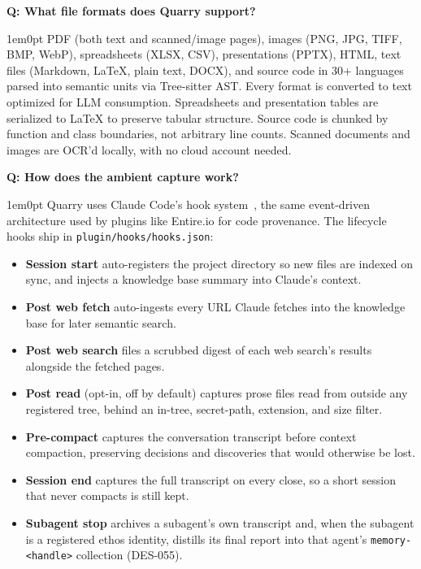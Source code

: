 \documentclass[11pt,letterpaper]{article}
\newcounter{faqnum}
\newenvironment{faqpair}[1]{%
  \needspace{4\baselineskip}%
  \vspace{0.5em}%
  \refstepcounter{faqnum}%
  \noindent\textbf{\color{SectionBlue}Q\thefaqnum: #1}\par\nopagebreak[4]%
  \vspace{0.2em}%
  \begin{adjustwidth}{1em}{0pt}%
  \setlength{\parindent}{0pt}%
}{%
  \end{adjustwidth}%
  \vspace{0.5em}%
}
\begin{document}
\begin{faqpair}{What file formats does Quarry support?}\label{faq:formats}
  PDF (both text and scanned/image pages), images (PNG, JPG, TIFF, BMP, WebP),
  spreadsheets (XLSX, CSV), presentations (PPTX), HTML, text files (Markdown,
  LaTeX, plain text, DOCX), and source code in 30+ languages parsed into
  semantic units via Tree-sitter AST. Every format is converted to text
  optimized for LLM consumption. Spreadsheets and presentation tables are
  serialized to LaTeX to preserve tabular structure. Source code is chunked by
  function and class boundaries, not arbitrary line counts. Scanned documents
  and images are OCR'd locally, with no cloud account needed.
\end{faqpair}

\begin{faqpair}{How does the ambient capture work?}\label{faq:how-it-works}
  Quarry uses Claude Code's hook system~\cite{claude-code-hooks}, the same
  event-driven architecture used by plugins like Entire.io for code provenance.
  The lifecycle hooks ship in \texttt{plugin/hooks/hooks.json}:

  \begin{itemize}[leftmargin=1.5em, nosep]
    \item \textbf{Session start} auto-registers the project directory so
          new files are indexed on sync, and injects a knowledge base summary
          into Claude's context.
    \item \textbf{Post web fetch} auto-ingests every URL Claude fetches
          into the knowledge base for later semantic search.
    \item \textbf{Post web search} files a scrubbed digest of each web
          search's results alongside the fetched pages.
    \item \textbf{Post read} (opt-in, off by default) captures prose files
          read from outside any registered tree, behind an in-tree,
          secret-path, extension, and size filter.
    \item \textbf{Pre-compact} captures the conversation transcript before
          context compaction, preserving decisions and discoveries that would
          otherwise be lost.
    \item \textbf{Session end} captures the full transcript on every close,
          so a short session that never compacts is still kept.
    \item \textbf{Subagent stop} archives a subagent's own transcript and,
          when the subagent is a registered ethos identity, distills its final
          report into that agent's \texttt{memory-<handle>} collection
          (DES-055).
  \end{itemize}


\end{faqpair}
\end{document}
